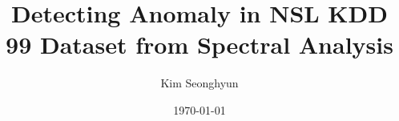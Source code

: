 \title{Detecting Anomaly in NSL KDD 99 Dataset from Spectral Analysis}
\author{Kim Seonghyun}
\date{\today}
